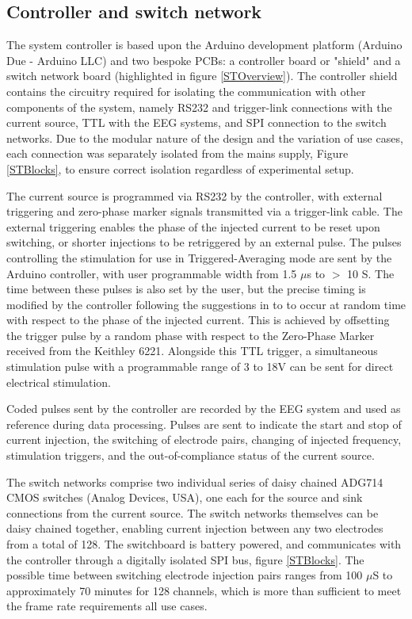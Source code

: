 \subsection{Controller and switch network}

The system controller is based upon the Arduino development platform (Arduino Due - Arduino LLC) and two bespoke PCBs: a controller board or "shield" and a switch network board (highlighted in figure \ref{STOverview}). The controller shield contains the circuitry required for isolating the communication with other components of the system, namely RS232 and trigger-link connections with the current source, TTL with the EEG systems, and SPI connection to the switch networks. Due to the modular nature of the design and the variation of use cases, each connection was separately isolated from the mains supply, Figure \ref{STBlocks}, to ensure correct isolation regardless of experimental setup.

The current source is programmed via RS232 by the controller, with external triggering and zero-phase marker signals transmitted via a trigger-link cable. The external triggering enables the phase of the injected current to be reset upon switching, or shorter injections to be retriggered by an external pulse. The pulses controlling the stimulation for use in Triggered-Averaging mode are sent by the Arduino controller, with user programmable width from 1.5 $\mu$s to $>$ 10 S. The time between these pulses is also set by the user, but the precise timing is modified by the controller following the suggestions in \cite{Aristovich_2015} to to occur at random time with respect to the phase of the injected current. This is achieved by offsetting the trigger pulse by a random phase with respect to the Zero-Phase Marker received from the Keithley 6221. Alongside this TTL trigger, a simultaneous stimulation pulse with a programmable range of 3 to 18V can be sent for direct electrical stimulation.

Coded pulses sent by the controller are recorded by the EEG system and used as reference during data processing. Pulses are sent to indicate the start and stop of current injection, the switching of electrode pairs, changing of injected frequency, stimulation triggers, and the out-of-compliance status of the current source. 

The switch networks comprise two individual series of daisy chained ADG714 CMOS switches (Analog Devices, USA), one each for the source and sink connections from the current source. The switch networks themselves can be daisy chained together, enabling current injection between any two electrodes from a total of 128. The switchboard is battery powered, and communicates with the controller through a digitally isolated SPI bus, figure \ref{STBlocks}. The possible time between switching electrode injection pairs ranges from 100 $\mu$S to approximately 70 minutes for 128 channels, which is more than sufficient to meet the frame rate requirements all use cases. 